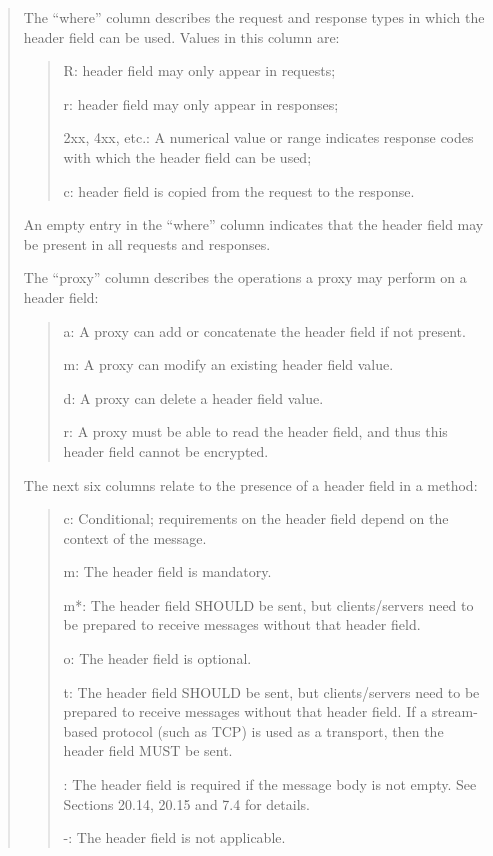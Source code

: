 \documentclass[letterpaper,notitlepage,times,12pt]{article}
\begin{document}
\begin{quote}
The ``where'' column describes the request and response types in which the header field can be used.  Values in this column are:
\begin{quote}
\begin{description}
\item R: header field may only appear in requests;
\item r: header field may only appear in responses;
\item 2xx, 4xx, etc.: A numerical value or range indicates response codes with which the header field can be used;
\item c: header field is copied from the request to the response.
\end{description}
\end{quote}

An empty entry in the ``where'' column indicates that the header field may be present in all requests and responses.

The ``proxy'' column describes the operations a proxy may perform on a header field:

\begin{quote}
\begin{description}
\item a: A proxy can add or concatenate the header field if not present.
\item m: A proxy can modify an existing header field value.
\item d: A proxy can delete a header field value.
\item r: A proxy must be able to read the header field, and thus this header field cannot be encrypted.
\end{description}
\end{quote}

The next six columns relate to the presence of a header field in a method:

\begin{quote}
\begin{description}
\item c: Conditional; requirements on the header field depend on the context of the message.
\item m: The header field is mandatory.
\item m*: The header field SHOULD be sent, but clients/servers need to be prepared to receive messages without that header field.
\item o: The header field is optional.
\item t: The header field SHOULD be sent, but clients/servers need to be prepared to receive messages without that header field.  If a stream-based protocol (such as TCP) is used as a transport, then the header field MUST be sent.
\item *: The header field is required if the message body is not empty. See Sections 20.14, 20.15 and 7.4 for details.
\item -: The header field is not applicable.
\end{description}
\end{quote}


\end{quote}
\end{document}
